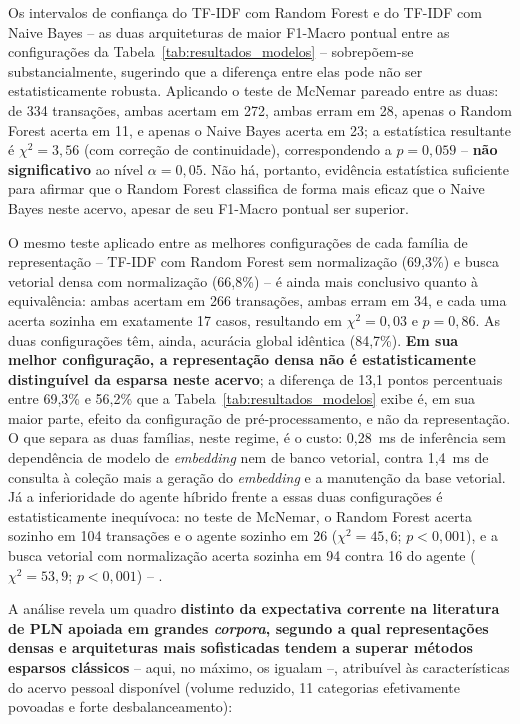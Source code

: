 Os intervalos de confiança do TF-IDF com Random Forest e do TF-IDF com Naive Bayes -- as duas arquiteturas de maior F1-Macro pontual entre as configurações da Tabela~\ref{tab:resultados_modelos} -- sobrepõem-se substancialmente, sugerindo que a diferença entre elas pode não ser estatisticamente robusta. Aplicando o teste de McNemar pareado entre as duas: de 334 transações, ambas acertam em 272, ambas erram em 28, apenas o Random Forest acerta em 11, e apenas o Naive Bayes acerta em 23; a estatística resultante é $\chi^2 = 3{,}56$ (com correção de continuidade), correspondendo a $p = 0{,}059$ -- \textbf{não significativo} ao nível $\alpha = 0{,}05$. Não há, portanto, evidência estatística suficiente para afirmar que o Random Forest classifica de forma mais eficaz que o Naive Bayes neste acervo, apesar de seu F1-Macro pontual ser superior.

O mesmo teste aplicado entre as melhores configurações de cada família de representação -- TF-IDF com Random Forest sem normalização (69,3\%) e busca vetorial densa com normalização (66,8\%) -- é ainda mais conclusivo quanto à equivalência: ambas acertam em 266 transações, ambas erram em 34, e cada uma acerta sozinha em exatamente 17 casos, resultando em $\chi^2 = 0{,}03$ e $p = 0{,}86$. As duas configurações têm, ainda, acurácia global idêntica (84,7\%). \textbf{Em sua melhor configuração, a representação densa não é estatisticamente distinguível da esparsa neste acervo}; a diferença de 13,1 pontos percentuais entre 69,3\% e 56,2\% que a Tabela~\ref{tab:resultados_modelos} exibe é, em sua maior parte, efeito da configuração de pré-processamento, e não da representação. O que separa as duas famílias, neste regime, é o custo: 0,28~ms de inferência sem dependência de modelo de \textit{embedding} nem de banco vetorial, contra 1,4~ms de consulta à coleção mais a geração do \textit{embedding} e a manutenção da base vetorial. Já a inferioridade do agente híbrido frente a essas duas configurações é estatisticamente inequívoca: no teste de McNemar, o Random Forest acerta sozinho em 104 transações e o agente sozinho em 26 ($\chi^2 = 45{,}6$; $p < 0{,}001$), e a busca vetorial com normalização acerta sozinha em 94 contra 16 do agente ($\chi^2 = 53{,}9$; $p < 0{,}001$) -- .

A análise revela um quadro \textbf{distinto da expectativa corrente na literatura de PLN apoiada
em grandes \textit{corpora}, segundo a qual representações densas e arquiteturas mais sofisticadas
tendem a superar métodos esparsos clássicos} -- aqui, no máximo, os igualam --, atribuível às características do acervo pessoal disponível (volume reduzido,
11 categorias efetivamente povoadas e forte
desbalanceamento):

